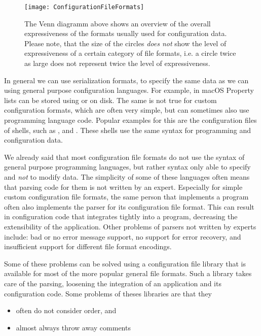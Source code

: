 \begin{figure}[H]
  \centering
  \texttt{[image: ConfigurationFileFormats]}
  \caption{The Venn diagramm above shows an overview of the overall expressiveness of the formats usually used for configuration data. Please note, that the size of the circles \emph{does not} show the level of expressiveness of a certain category of file formats, i.e. a circle twice as large does not represent twice the level of expressiveness.}
\end{figure}

In general we can use serialization formats, to specify the same data as we can using general purpose configuration languages. For example, in macOS Property lists can be stored using  or  on disk. The same is not true for custom configuration formats, which are often very simple, but can sometimes also use programming language code. Popular examples for this are the configuration files of shells, such as ,  and . These shells use the same syntax for programming and configuration data.

We already said that most configuration file formats do not use the syntax of general purpose programming languages, but rather syntax only able to specify and \emph{not} to modify data. The simplicity of some of these languages often means that parsing code for them is not written by an expert. Especially for simple custom configuration file formats, the same person that implements a program often also implements the parser for its configuration file format. This can result in configuration code that integrates tightly into a program, decreasing the extensibility of the application. Other problems of parsers not written by experts include: bad or no error message support, no support for error recovery, and insufficient support for different file format encodings.

Some of these problems can be solved using a configuration file library that is available for most of the more popular general file formats. Such a library takes care of the parsing, loosening the integration of an application and its configuration code. Some problems of theses libraries are that they

\begin{itemize}
  \item often do not consider order, and
  \item almost always throw away comments
\end{itemize}

